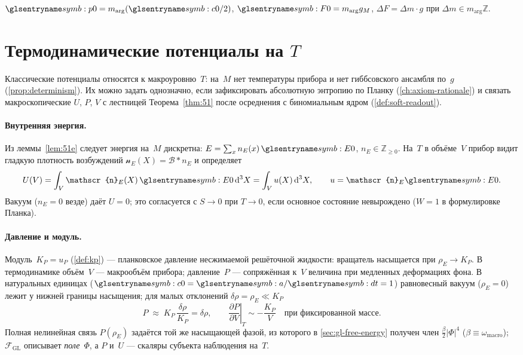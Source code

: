 \begin{corollary}
$\ladderMomentum=m_{\arg}(\caSignalSpeed/2)$, $\ladderForce=m_{\arg} g_M$, $\Delta F=\Delta m\cdot g$ при $\Delta m\in m_{\arg}\mathbb{Z}$.
\end{corollary}

\section{Термодинамические потенциалы на \texorpdfstring{$T$}{T}}
\label{sec:thermo-potentials}

Классические потенциалы относятся к макроуровню~$T$: на~$M$ нет температуры прибора
и нет гиббсовского ансамбля по~$g$ (\cref{prop:determinism}).
Их можно задать однозначно, если зафиксировать абсолютную энтропию по Планку
(\cref{ch:axiom-rationale}) и связать макроскопические $U$, $P$, $V$ с лестницей
Теорема~\ref{thm:51} после осреднения с биномиальным ядром (\cref{def:soft-readout}).

\paragraph{Внутренняя энергия.}
Из леммы~\ref{lem:51e} следует энергия на~$M$ дискретна: $E=\sum_x n_E(x)\,\ladderEnergy$,
$n_E\in\mathbb{Z}_{\ge 0}$.
На~$T$ в объёме~$V$ прибор видит гладкую плотность возбуждений
$\mathscr{n}_E(X)=\mathcal{B}*n_E$ и определяет
\begin{equation}
\label{eq:internal-energy}
  U(V)=\int_V \mathscr{n}_E(X)\,\ladderEnergy\,\mathrm{d}^3X
  = \int_V u(X)\,\mathrm{d}^3X,
  \qquad u=\mathscr{n}_E \ladderEnergy.
\end{equation}
Вакуум ($n_E=0$ везде) даёт $U=0$; это согласуется с $S\to 0$ при $T\to 0$,
если основное состояние невырождено ($W=1$ в формулировке Планка).

\paragraph{Давление и модуль.}
Модуль~$K_P=u_P$ (\cref{def:kp}) --- планковское давление несжимаемой решёточной жидкости:
вращатель насыщается при $\rho_E\to K_P$.
В термодинамике объём~$V$ --- макрообъём прибора; давление~$P$ --- сопряжённая
к~$V$ величина при медленных деформациях фона.
В натуральных единицах ($\caSignalSpeed=\caStepSpace/\htick=1$) равновесный вакуум ($\rho_E=0$)
лежит у нижней границы насыщения; для малых отклонений $\delta\rho=\rho_E\ll K_P$
\begin{equation}
\label{eq:pressure-linear}
  P \;\approx\; K_P\,\frac{\delta\rho}{K_P} = \delta\rho,
  \qquad
  \left.\frac{\partial P}{\partial V}\right|_{T}
  \sim -\frac{K_P}{V}\quad\text{при фиксированной массе.}
\end{equation}
Полная нелинейная связь $P(\rho_E)$ задаётся той же насыщающей фазой,
из которого в \cref{sec:gl-free-energy} получен член $\tfrac{\beta}{2}|\Phi|^4$
($\beta\equiv\omega_{\mathrm{macro}}$);
$\mathcal{F}_{\mathrm{GL}}$ описывает \emph{поле}~$\Phi$, а $P$ и~$U$ --- скаляры
субъекта наблюдения на~$T$.

